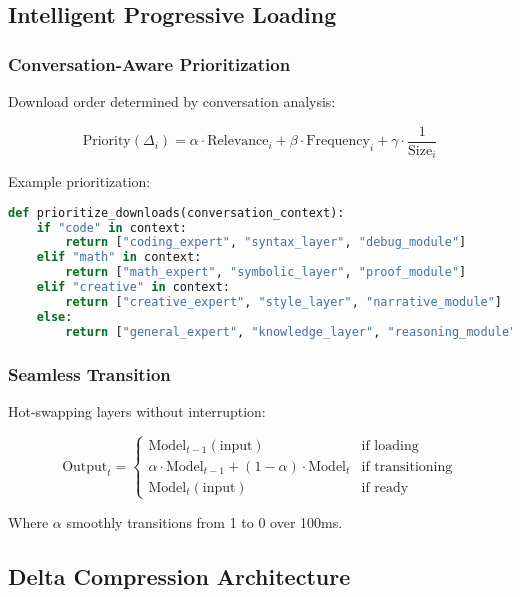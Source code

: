 \subsection{Intelligent Progressive Loading}

\subsubsection{Conversation-Aware Prioritization}

Download order determined by conversation analysis:

\begin{equation}
\text{Priority}(\Delta_i) = \alpha \cdot \text{Relevance}_i + \beta \cdot \text{Frequency}_i + \gamma \cdot \frac{1}{\text{Size}_i}
\end{equation}

Example prioritization:
\begin{lstlisting}[language=Python, basicstyle=\small\ttfamily]
def prioritize_downloads(conversation_context):
    if "code" in context:
        return ["coding_expert", "syntax_layer", "debug_module"]
    elif "math" in context:
        return ["math_expert", "symbolic_layer", "proof_module"]
    elif "creative" in context:
        return ["creative_expert", "style_layer", "narrative_module"]
    else:
        return ["general_expert", "knowledge_layer", "reasoning_module"]
\end{lstlisting}

\subsubsection{Seamless Transition}

Hot-swapping layers without interruption:

\begin{equation}
\text{Output}_t = \begin{cases}
\text{Model}_{t-1}(\text{input}) & \text{if loading} \\
\alpha \cdot \text{Model}_{t-1} + (1-\alpha) \cdot \text{Model}_t & \text{if transitioning} \\
\text{Model}_t(\text{input}) & \text{if ready}
\end{cases}
\end{equation}

Where $\alpha$ smoothly transitions from 1 to 0 over 100ms.

\subsection{Delta Compression Architecture}

